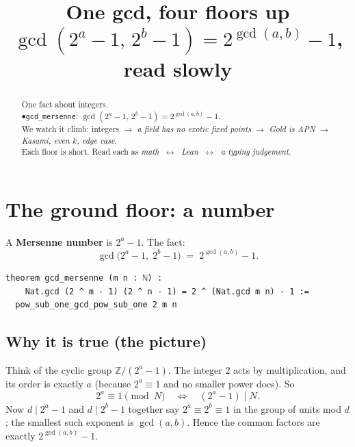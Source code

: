 \documentclass[11pt]{article}
\title{\textbf{One gcd, four floors up}\\[4pt]
\large $\gcd(2^a-1,\,2^b-1)=2^{\gcd(a,b)}-1$, read slowly}
\author{}
\date{}
\begin{document}
\maketitle

\begin{abstract}
\noindent
One fact about integers.\\[2pt]
$\bullet$\quad \texttt{gcd\_mersenne}:\;\; $\gcd(2^a-1,\,2^b-1)=2^{\gcd(a,b)}-1$.\\[6pt]
\noindent
We watch it climb: integers $\to$ \emph{a field has no exotic fixed points} $\to$
\emph{Gold is APN} $\to$ \emph{Kasami, even $k$, edge case}.\\[2pt]
Each floor is short. Read each as \emph{math} $\;\leftrightarrow\;$ \emph{Lean} $\;\leftrightarrow\;$
\emph{a typing judgement}.
\end{abstract}

\bigskip

\section*{The ground floor: a number}

\noindent
A \textbf{Mersenne number} is $2^a-1$. The fact:
\[
\gcd\bigl(2^a-1,\;2^b-1\bigr)\;=\;2^{\gcd(a,b)}-1 .
\]

\begin{lstlisting}
theorem gcd_mersenne (m n : ℕ) :
    Nat.gcd (2 ^ m - 1) (2 ^ n - 1) = 2 ^ (Nat.gcd m n) - 1 :=
  pow_sub_one_gcd_pow_sub_one 2 m n
\end{lstlisting}


\bigskip
\subsection*{Why it is true (the picture)}

\noindent
Think of the cyclic group $\mathbb{Z}/(2^a-1)$. The integer $2$ acts by
multiplication, and its order is exactly $a$ (because $2^a\equiv 1$ and no
smaller power does). So
\[
2^a\equiv 1 \pmod{N}
\quad\Longleftrightarrow\quad
(2^a-1)\mid N .
\]
Now $d\mid 2^a-1$ and $d\mid 2^b-1$ together say $2^a\equiv 2^b\equiv 1$ in the
group of units mod $d$; the smallest such exponent is $\gcd(a,b)$. Hence the
common factors are exactly $2^{\gcd(a,b)}-1$.
\end{document}
